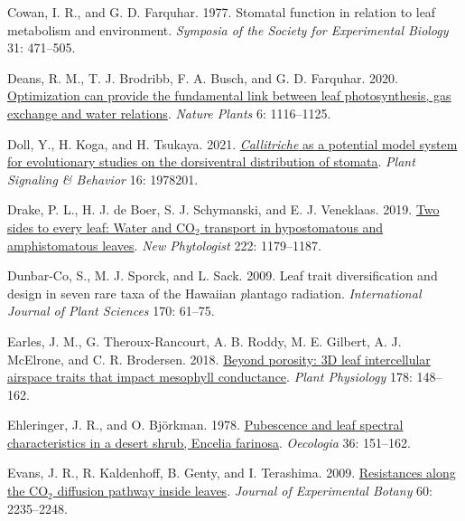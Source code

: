 \documentclass[
  letterpaper,
  DIV=11,
  numbers=noendperiod]{scrartcl}
\newlength{\cslhangindent}
\newlength{\cslentryspacingunit} %
\newenvironment{CSLReferences}[2] %
 {%
  \setlength{\parindent}{0pt}
  \ifodd #1
  \let\oldpar\par
  \def\par{\hangindent=\cslhangindent\oldpar}
  \fi
  \setlength{\parskip}{#2\cslentryspacingunit}
 }%
 {}
\begin{document}
\begin{CSLReferences}{1}{0}
\leavevmode{}%
Cowan, I. R., and G. D. Farquhar. 1977. Stomatal function in relation to
leaf metabolism and environment. \emph{Symposia of the Society for
Experimental Biology} 31: 471--505.

\leavevmode{}%
Deans, R. M., T. J. Brodribb, F. A. Busch, and G. D. Farquhar. 2020.
\href{https://doi.org/10.1038/s41477-020-00760-6}{Optimization can
provide the fundamental link between leaf photosynthesis, gas exchange
and water relations}. \emph{Nature Plants} 6: 1116--1125.

\leavevmode{}%
Doll, Y., H. Koga, and H. Tsukaya. 2021.
\href{https://doi.org/10.1080/15592324.2021.1978201}{\emph{Callitriche}
as a potential model system for evolutionary studies on the dorsiventral
distribution of stomata}. \emph{Plant Signaling \& Behavior} 16:
1978201.

\leavevmode{}%
Drake, P. L., H. J. de Boer, S. J. Schymanski, and E. J. Veneklaas.
2019. \href{https://doi.org/10.1111/nph.15652}{Two sides to every leaf:
Water and {CO}\(_{\textrm{2}}\) transport in hypostomatous and
amphistomatous leaves}. \emph{New Phytologist} 222: 1179--1187.

\leavevmode{}%
Dunbar-Co, S., M. J. Sporck, and L. Sack. 2009. Leaf trait
diversification and design in seven rare taxa of the {Hawaiian}
\emph{p}lantago radiation. \emph{International Journal of Plant
Sciences} 170: 61--75.

\leavevmode{}%
Earles, J. M., G. Theroux-Rancourt, A. B. Roddy, M. E. Gilbert, A. J.
McElrone, and C. R. Brodersen. 2018.
\href{https://doi.org/10.1104/pp.18.00550}{Beyond porosity: {3D} leaf
intercellular airspace traits that impact mesophyll conductance}.
\emph{Plant Physiology} 178: 148--162.

\leavevmode{}%
Ehleringer, J. R., and O. Björkman. 1978.
\href{https://doi.org/10.1007/BF00349805}{Pubescence and leaf spectral
characteristics in a desert shrub, {Encelia} farinosa}. \emph{Oecologia}
36: 151--162.

\leavevmode{}%
Evans, J. R., R. Kaldenhoff, B. Genty, and I. Terashima. 2009.
\href{https://doi.org/10.1093/jxb/erp117}{Resistances along the
{CO}\(_{\textrm{2}}\) diffusion pathway inside leaves}. \emph{Journal of
Experimental Botany} 60: 2235--2248.


\end{CSLReferences}
\end{document}
